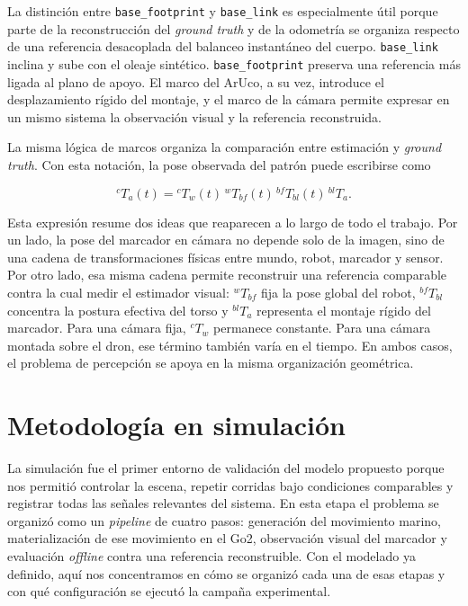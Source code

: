\documentclass[12pt,a4paper]{report}
\begin{document}
La distinción entre \texttt{base\_footprint} y \texttt{base\_link} es
especialmente útil porque parte de la reconstrucción del \textit{ground truth} y de la
odometría se organiza respecto de una referencia desacoplada del balanceo
instantáneo del cuerpo. \texttt{base\_link} inclina y sube con el oleaje
sintético. \texttt{base\_footprint} preserva una referencia más ligada al plano
de apoyo. El marco del ArUco, a su vez, introduce el desplazamiento rígido del montaje,
y el marco de la cámara permite expresar en un mismo sistema la observación visual
y la referencia reconstruida.

La misma lógica de marcos organiza la comparación entre estimación y \textit{ground truth}. Con esta notación, la pose observada del patrón puede escribirse como

\begin{equation}
{}^{c}\!T_a(t) =
{}^{c}\!T_w(t)\,{}^{w}\!T_{bf}(t)\,{}^{bf}\!T_{bl}(t)\,{}^{bl}\!T_a.
\label{eq:camera_marker_chain}
\end{equation}

Esta expresión resume dos ideas que reaparecen a lo largo de todo el trabajo.
Por un lado, la pose del marcador en cámara no depende solo de la imagen, sino
de una cadena de transformaciones físicas entre mundo, robot, marcador y
sensor. Por otro lado, esa misma cadena permite reconstruir una referencia
comparable contra la cual medir el estimador visual: \({}^{w}\!T_{bf}\) fija la
pose global del robot, \({}^{bf}\!T_{bl}\) concentra la postura efectiva del
torso y \({}^{bl}\!T_a\) representa el montaje rígido del marcador. Para una
cámara fija, \({}^{c}\!T_w\) permanece constante. Para una cámara montada sobre
el dron, ese término también varía en el tiempo. En ambos casos, el problema
de percepción se apoya en la misma organización geométrica.



\section{Metodología en simulación}

La simulación fue el primer entorno de validación del modelo propuesto porque nos
permitió controlar la escena, repetir corridas bajo condiciones comparables y
registrar todas las señales relevantes del sistema. En esta etapa el problema
se organizó como un \textit{pipeline} de cuatro pasos: generación del movimiento
marino, materialización de ese movimiento en el Go2, observación visual del
marcador y evaluación \textit{offline} contra una referencia reconstruible. Con el modelado ya definido, aquí nos concentramos en
cómo se organizó cada una de esas etapas y con qué configuración se ejecutó la
campaña experimental.
\end{document}
